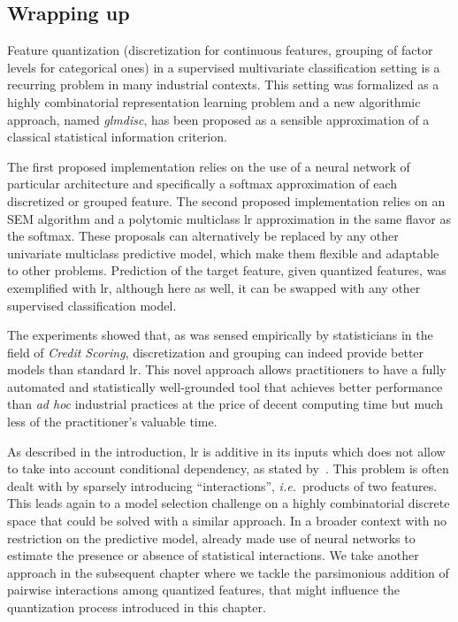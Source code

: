 \subsection{Wrapping up}

Feature quantization (discretization for continuous features, grouping of factor levels for categorical ones) in a supervised multivariate classification setting is a recurring problem in many industrial contexts. This setting was formalized as a highly combinatorial representation learning problem and a new algorithmic approach, named \textit{glmdisc}, has been proposed as a sensible approximation of a classical statistical information criterion.

The first proposed implementation relies on the use of a neural network of particular architecture and specifically a softmax approximation of each discretized or grouped feature. The second proposed implementation relies on an SEM algorithm and a polytomic multiclass \gls{lr} approximation in the same flavor as the softmax. These proposals can alternatively be replaced by any other univariate multiclass predictive model, which make them flexible and adaptable to other problems. Prediction of the target feature, given quantized features, was exemplified with \gls{lr}, although here as well, it can be swapped with any other supervised classification model.

The experiments showed that, as was sensed empirically by statisticians in the field of \textit{Credit Scoring}, discretization and grouping can indeed provide better models than standard \gls{lr}. This novel approach allows practitioners to have a fully automated and statistically well-grounded tool that achieves better performance than \textit{ad hoc} industrial practices at the price of decent computing time but much less of the practitioner's valuable time.

As described in the introduction, \gls{lr} is additive in its inputs which does not allow to take into account conditional dependency, as stated by~\cite{berry2010testing}. This problem is often dealt with by sparsely introducing ``interactions'', \textit{i.e.}\ products of two features. This leads again to a model selection challenge on a highly combinatorial discrete space that could be solved with a similar approach. In a broader context with no restriction on the predictive model, \cite{tsang2018detecting} already made use of neural networks to estimate the presence or absence of statistical interactions. We take another approach in the subsequent chapter where we tackle the parsimonious addition of pairwise interactions among quantized features, that might influence the quantization process introduced in this chapter.

\printbibliography[heading=subbibliography, title=References of Chapter 3]